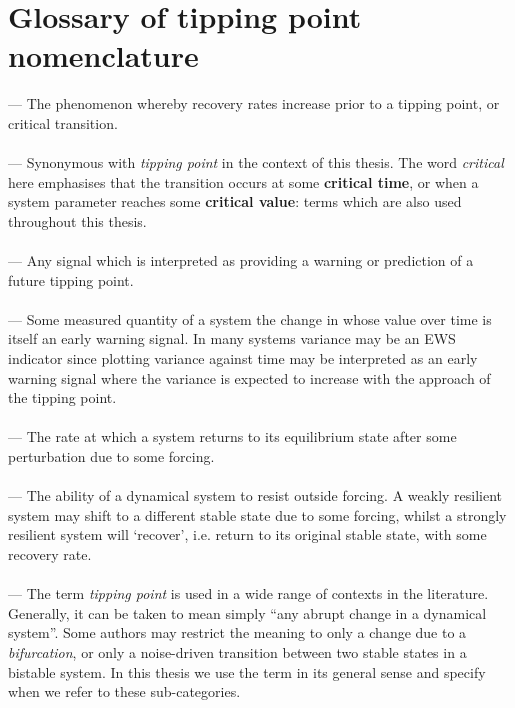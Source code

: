 \documentclass[a4paper,12pt,times,custombib, print]{PhDThesisPSnPDF}
\begin{document}
\chapter{Glossary of tipping point nomenclature}
{\small
	 — The phenomenon whereby recovery rates increase prior to a tipping point, or critical transition.\\
	\vspace{-0.3cm}\\
	 — Synonymous with \emph{tipping point} in the context of this thesis. The word \emph{critical} here emphasises that the transition occurs at some {\bf critical time}, or when a system parameter reaches some {\bf critical value}: terms which are also used throughout this thesis.\\
	\vspace{-0.3cm}\\
	 — Any signal which is interpreted as providing a warning or prediction of a future tipping point.\\
	\vspace{-0.3cm}\\
	 — Some measured quantity of a system the change in whose value over time is itself an early warning signal. In many systems variance may be an EWS indicator since plotting variance against time may be interpreted as an early warning signal where the variance is expected to increase with the approach of the tipping point. \\
	\vspace{-0.3cm}\\
	 — The rate at which a system returns to its equilibrium state after some perturbation due to some forcing. \\
	\vspace{-0.3cm}\\
	 — The ability of a dynamical system to resist outside forcing. A weakly resilient system may shift to a different stable state due to some forcing, whilst a strongly resilient system will `recover', i.e. return to its original stable state, with some recovery rate. \\
	\vspace{-0.3cm}\\
	 — The term \emph{tipping point} is used in a wide range of contexts in the literature. Generally, it can be taken to mean simply ``any abrupt change in a dynamical system''. Some authors may restrict the meaning to only a change due to a \emph{bifurcation}, or only a noise-driven transition between two stable states in a bistable system. In this thesis we use the term in its general sense and specify when we refer to these sub-categories.\\
	
}
\end{document}

